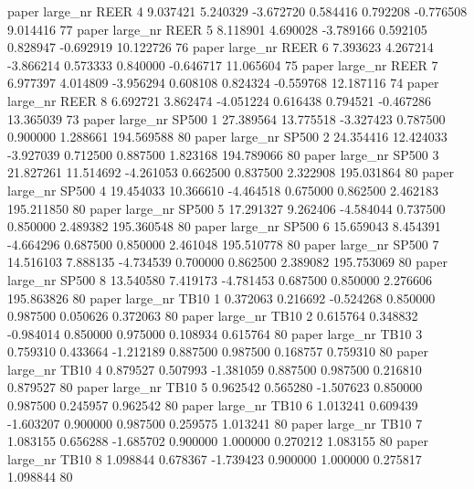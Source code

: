        paper   large_nr     REER                 4  9.037421  5.240329  -3.672720 0.584416 0.792208 -0.776508    9.014416 77
       paper   large_nr     REER                 5  8.118901  4.690028  -3.789166 0.592105 0.828947 -0.692919   10.122726 76
       paper   large_nr     REER                 6  7.393623  4.267214  -3.866214 0.573333 0.840000 -0.646717   11.065604 75
       paper   large_nr     REER                 7  6.977397  4.014809  -3.956294 0.608108 0.824324 -0.559768   12.187116 74
       paper   large_nr     REER                 8  6.692721  3.862474  -4.051224 0.616438 0.794521 -0.467286   13.365039 73
       paper   large_nr    SP500                 1 27.389564 13.775518  -3.327423 0.787500 0.900000  1.288661  194.569588 80
       paper   large_nr    SP500                 2 24.354416 12.424033  -3.927039 0.712500 0.887500  1.823168  194.789066 80
       paper   large_nr    SP500                 3 21.827261 11.514692  -4.261053 0.662500 0.837500  2.322908  195.031864 80
       paper   large_nr    SP500                 4 19.454033 10.366610  -4.464518 0.675000 0.862500  2.462183  195.211850 80
       paper   large_nr    SP500                 5 17.291327  9.262406  -4.584044 0.737500 0.850000  2.489382  195.360548 80
       paper   large_nr    SP500                 6 15.659043  8.454391  -4.664296 0.687500 0.850000  2.461048  195.510778 80
       paper   large_nr    SP500                 7 14.516103  7.888135  -4.734539 0.700000 0.862500  2.389082  195.753069 80
       paper   large_nr    SP500                 8 13.540580  7.419173  -4.781453 0.687500 0.850000  2.276606  195.863826 80
       paper   large_nr     TB10                 1  0.372063  0.216692  -0.524268 0.850000 0.987500  0.050626    0.372063 80
       paper   large_nr     TB10                 2  0.615764  0.348832  -0.984014 0.850000 0.975000  0.108934    0.615764 80
       paper   large_nr     TB10                 3  0.759310  0.433664  -1.212189 0.887500 0.987500  0.168757    0.759310 80
       paper   large_nr     TB10                 4  0.879527  0.507993  -1.381059 0.887500 0.987500  0.216810    0.879527 80
       paper   large_nr     TB10                 5  0.962542  0.565280  -1.507623 0.850000 0.987500  0.245957    0.962542 80
       paper   large_nr     TB10                 6  1.013241  0.609439  -1.603207 0.900000 0.987500  0.259575    1.013241 80
       paper   large_nr     TB10                 7  1.083155  0.656288  -1.685702 0.900000 1.000000  0.270212    1.083155 80
       paper   large_nr     TB10                 8  1.098844  0.678367  -1.739423 0.900000 1.000000  0.275817    1.098844 80
